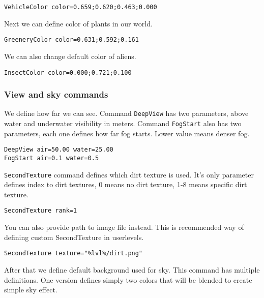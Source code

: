\begin{lstlisting}[style=scene]
VehicleColor color=0.659;0.620;0.463;0.000
\end{lstlisting}

Next we can define color of plants in our world.

\begin{lstlisting}[style=scene]
GreeneryColor color=0.631;0.592;0.161
\end{lstlisting}

We can also change default color of aliens.

\begin{lstlisting}[style=scene]
InsectColor color=0.000;0.721;0.100
\end{lstlisting}


\subsubsection{View and sky commands}

We define how far we can see. Command \texttt{DeepView} has two parameters, above water and underwater visibility in meters. Command \texttt{FogStart} also has two parameters, each one defines how far fog starts. Lower value means denser fog.

\begin{lstlisting}[style=scene]
DeepView air=50.00 water=25.00
FogStart air=0.1 water=0.5
\end{lstlisting}

\texttt{SecondTexture} command defines which dirt texture is used. It's only parameter defines index to dirt textures, 0 means no dirt texture, 1-8 means specific dirt texture.

\begin{lstlisting}[style=scene]
SecondTexture rank=1
\end{lstlisting}

You can also provide path to image file instead. This is recommended way of defining custom SecondTexture in userlevels.
\begin{lstlisting}[style=scene]
SecondTexture texture="%lvl%/dirt.png"
\end{lstlisting}


After that we define default background used for sky. This command has multiple definitions. One version defines simply two colors that will be blended to create simple sky effect.

